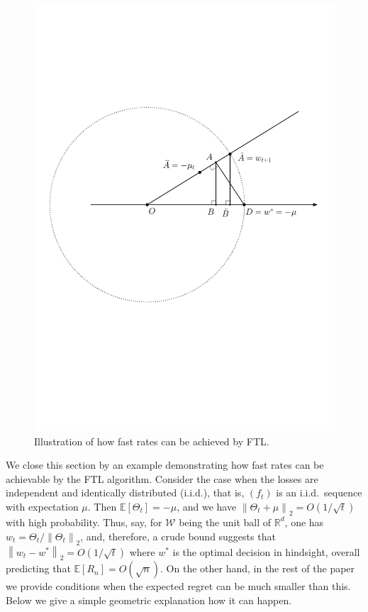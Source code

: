 \documentclass[english]{article}
\newcommand{\cW}{\mathcal{W}}
\newcommand{\Exp}[1]{\mathbb{E}\left[ #1 \right]}
\newcommand{\R}{\mathbb{R}}
\newcommand{\norm}[1]{\left\| #1 \right\|}
\begin{document}
\begin{figure}
	\vspace{-.7cm}
\begin{framed}
	\centering
	\includegraphics[width = \textwidth,
	trim={6.2cm 3.5cm 1.5cm 0},clip]
	{figures/ExcessError}
	\vspace{-0.4cm}
	\caption{Illustration of how fast rates can be achieved by FTL.
	}
	\label{fig:excesserror}
	\vspace{-0.1cm}
\end{framed}
	\vspace{-1cm}
\end{figure} 
%
We close this section by an example demonstrating how fast rates can be achievable by the FTL algorithm. Consider the case when the losses are independent and identically distributed (i.i.d.),
that is, $(f_t)$ is an i.i.d.\ sequence with expectation $\mu$. Then  $\Exp{\Theta_t} = -\mu$, and we have $\norm{\Theta_t +\mu}_2 = O(1/\sqrt{t})$ with high probability. 
Thus, say, for $\cW$ being the unit ball of $\R^d$, one has $w_t = \Theta_t/\norm{\Theta_t}_2$, and, therefore,
a crude bound suggests that $\norm{w_t-  w^* }_2 = O(1/\sqrt{t})$ where $w^*$ is the optimal decision in hindsight, overall predicting that $\Exp{R_n} = O(\sqrt{n})$.
On the other hand, in the rest of the paper we provide conditions when the expected regret can be much smaller than this. Below we give a simple geometric explanation how it can happen.
\end{document}
